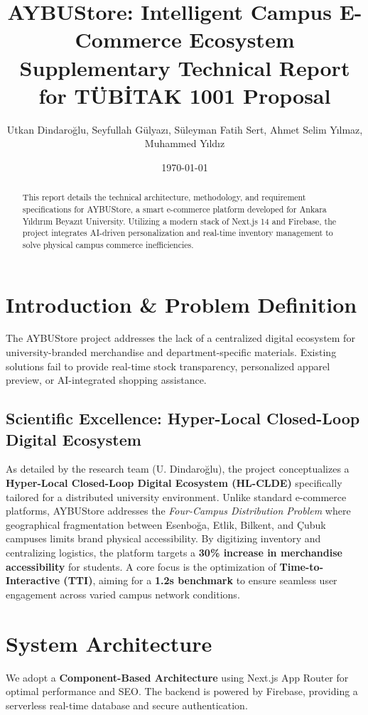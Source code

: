 \documentclass[11pt,a4paper]{article}
\title{\LARGE \textbf{AYBUStore: Intelligent Campus E-Commerce Ecosystem}\\[0.5em] \large Supplementary Technical Report for TÜBİTAK 1001 Proposal}
\author{Utkan Dindaroğlu, Seyfullah Gülyazı, Süleyman Fatih Sert, Ahmet Selim Yılmaz, Muhammed Yıldız}
\date{\today}
\begin{document}
\maketitle

\begin{abstract}
This report details the technical architecture, methodology, and requirement specifications for AYBUStore, a smart e-commerce platform developed for Ankara Yıldırım Beyazıt University. Utilizing a modern stack of Next.js 14 and Firebase, the project integrates AI-driven personalization and real-time inventory management to solve physical campus commerce inefficiencies.
\end{abstract}

\section{Introduction \& Problem Definition}
The AYBUStore project addresses the lack of a centralized digital ecosystem for university-branded merchandise and department-specific materials. Existing solutions fail to provide real-time stock transparency, personalized apparel preview, or AI-integrated shopping assistance.

\subsection{Scientific Excellence: Hyper-Local Closed-Loop Digital Ecosystem}
As detailed by the research team (U. Dindaroğlu), the project conceptualizes a \textbf{Hyper-Local Closed-Loop Digital Ecosystem (HL-CLDE)} specifically tailored for a distributed university environment. Unlike standard e-commerce platforms, AYBUStore addresses the \textit{Four-Campus Distribution Problem} where geographical fragmentation between Esenboğa, Etlik, Bilkent, and Çubuk campuses limits brand physical accessibility. By digitizing inventory and centralizing logistics, the platform targets a \textbf{30\% increase in merchandise accessibility} for students. A core focus is the optimization of \textbf{Time-to-Interactive (TTI)}, aiming for a \textbf{1.2s benchmark} to ensure seamless user engagement across varied campus network conditions.

\section{System Architecture}
We adopt a \textbf{Component-Based Architecture} using Next.js App Router for optimal performance and SEO. The backend is powered by Firebase, providing a serverless real-time database and secure authentication.
\end{document}
